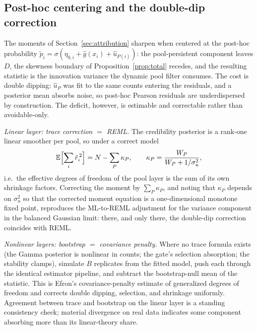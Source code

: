 \documentclass[11pt]{article}
\newcommand{\E}{\mathbb{E}}
\begin{document}
\subsection{Post-hoc centering and the double-dip correction}\label{sec:doubledip}

The moments of Section~\ref{sec:attribution} sharpen when centered at the post-hoc
probability $\tilde p_i=\sigma(\eta_{0,i}+\hat g(x_i)+\hat u_{P(i)})$: the
pool-persistent component leaves $D$, the skewness boundary of
Proposition~\ref{prop:total} recedes, and the resulting statistic is the innovation
variance the dynamic pool filter consumes. The cost is double dipping: $\hat u_P$ was
fit to the same counts entering the residuals, and a posterior mean absorbs noise, so
post-hoc Pearson residuals are underdispersed by construction. The deficit, however,
is estimable and correctable rather than avoidable-only.

\emph{Linear layer: trace correction $=$ REML.} The credibility posterior is a
rank-one linear smoother per pool, so under a correct model
\[
\E\Bigl[\sum_i \tilde r_i^{\,2}\Bigr]=N-\sum_P\kappa_P,
\qquad
\kappa_P=\frac{W_P}{W_P+1/\sigma_u^2},
\]
i.e.\ the effective degrees of freedom of the pool layer is the sum of its own
shrinkage factors. Correcting the moment by $\sum_P\kappa_P$, and noting that
$\kappa_P$ depends on $\sigma_u^2$ so that the corrected moment equation is a
one-dimensional monotone fixed point, reproduces the ML-to-REML adjustment
for the variance component in the balanced Gaussian limit: there, and only
there, the double-dip correction coincides with REML.

\emph{Nonlinear layers: bootstrap $=$ covariance penalty.} Where no trace formula
exists (the Gamma posterior is nonlinear in counts; the gate's selection absorption;
the stability clamps), simulate $B$ replicates from the fitted model, push each
through the identical estimator pipeline, and subtract the bootstrap-null mean of the
statistic. This is Efron's covariance-penalty estimate of generalized degrees of
freedom \cite{efron2004pred,ye1998} and corrects double dipping, selection, and
shrinkage uniformly. Agreement between trace and bootstrap on the linear layer is a
standing consistency check; material divergence on real data indicates some component
absorbing more than its linear-theory share.
\end{document}
